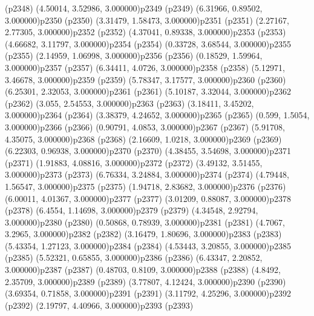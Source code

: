 \psdot(p2348)
\psPoint(4.50014, 3.52986, 3.000000){p2349}
\psdot(p2349)
\psPoint(6.31966, 0.89502, 3.000000){p2350}
\psdot(p2350)
\psPoint(3.31479, 1.58473, 3.000000){p2351}
\psdot(p2351)
\psPoint(2.27167, 2.77305, 3.000000){p2352}
\psdot(p2352)
\psPoint(4.37041, 0.89338, 3.000000){p2353}
\psdot(p2353)
\psPoint(4.66682, 3.11797, 3.000000){p2354}
\psdot(p2354)
\psPoint(0.33728, 3.68544, 3.000000){p2355}
\psdot(p2355)
\psPoint(2.14959, 1.06998, 3.000000){p2356}
\psdot(p2356)
\psPoint(0.18529, 1.59964, 3.000000){p2357}
\psdot(p2357)
\psPoint(6.34411, 4.0726, 3.000000){p2358}
\psdot(p2358)
\psPoint(5.12971, 3.46678, 3.000000){p2359}
\psdot(p2359)
\psPoint(5.78347, 3.17577, 3.000000){p2360}
\psdot(p2360)
\psPoint(6.25301, 2.32053, 3.000000){p2361}
\psdot(p2361)
\psPoint(5.10187, 3.32044, 3.000000){p2362}
\psdot(p2362)
\psPoint(3.055, 2.54553, 3.000000){p2363}
\psdot(p2363)
\psPoint(3.18411, 3.45202, 3.000000){p2364}
\psdot(p2364)
\psPoint(3.38379, 4.24652, 3.000000){p2365}
\psdot(p2365)
\psPoint(0.599, 1.5054, 3.000000){p2366}
\psdot(p2366)
\psPoint(0.90791, 4.0853, 3.000000){p2367}
\psdot(p2367)
\psPoint(5.91708, 4.35075, 3.000000){p2368}
\psdot(p2368)
\psPoint(2.16609, 1.0218, 3.000000){p2369}
\psdot(p2369)
\psPoint(6.22303, 0.96938, 3.000000){p2370}
\psdot(p2370)
\psPoint(4.38455, 3.54698, 3.000000){p2371}
\psdot(p2371)
\psPoint(1.91883, 4.08816, 3.000000){p2372}
\psdot(p2372)
\psPoint(3.49132, 3.51455, 3.000000){p2373}
\psdot(p2373)
\psPoint(6.76334, 3.24884, 3.000000){p2374}
\psdot(p2374)
\psPoint(4.79448, 1.56547, 3.000000){p2375}
\psdot(p2375)
\psPoint(1.94718, 2.83682, 3.000000){p2376}
\psdot(p2376)
\psPoint(6.00011, 4.01367, 3.000000){p2377}
\psdot(p2377)
\psPoint(3.01209, 0.88087, 3.000000){p2378}
\psdot(p2378)
\psPoint(6.4554, 1.14698, 3.000000){p2379}
\psdot(p2379)
\psPoint(4.34548, 2.92794, 3.000000){p2380}
\psdot(p2380)
\psPoint(0.50868, 0.78939, 3.000000){p2381}
\psdot(p2381)
\psPoint(4.7067, 3.2965, 3.000000){p2382}
\psdot(p2382)
\psPoint(3.16479, 1.80696, 3.000000){p2383}
\psdot(p2383)
\psPoint(5.43354, 1.27123, 3.000000){p2384}
\psdot(p2384)
\psPoint(4.53443, 3.20855, 3.000000){p2385}
\psdot(p2385)
\psPoint(5.52321, 0.65855, 3.000000){p2386}
\psdot(p2386)
\psPoint(6.43347, 2.20852, 3.000000){p2387}
\psdot(p2387)
\psPoint(0.48703, 0.8109, 3.000000){p2388}
\psdot(p2388)
\psPoint(4.8492, 2.35709, 3.000000){p2389}
\psdot(p2389)
\psPoint(3.77807, 4.12424, 3.000000){p2390}
\psdot(p2390)
\psPoint(3.69354, 0.71858, 3.000000){p2391}
\psdot(p2391)
\psPoint(3.11792, 4.25296, 3.000000){p2392}
\psdot(p2392)
\psPoint(2.19797, 4.40966, 3.000000){p2393}
\psdot(p2393)
